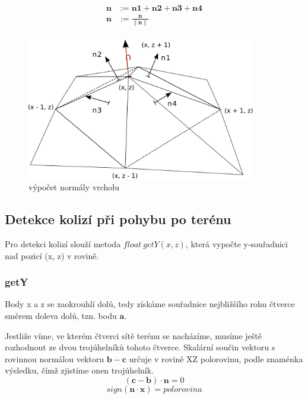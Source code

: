 \documentclass[11pt]{article}
\begin{document}
\begin{align*}
\mathbf n &:= \mathbf {n1} + \mathbf {n2} + \mathbf {n3} + \mathbf {n4} \\
\mathbf n &:= \frac{\mathbf n}{\|\mathbf n\|} \\
\end{align*}

\begin{figure}[ht!]
\centering
	\includegraphics[width=10cm]{normals_persp.pdf}
	\caption{výpočet normály vrcholu}
\end{figure}

\subsection{Detekce kolizí při pohybu po terénu}
Pro detekci kolizí slouží metoda $float~getY(x, z)$, která vypočte y-souřadnici
nad pozicí (x, z) v rovině.

\subsubsection{getY}
Body x a z se zaokrouhlí dolů, tedy získáme souřadnice nejbližšího rohu čtverce
směrem doleva dolů, tzn. bodu $\mathbf a$.

Jestliže víme, ve kterém čtverci sítě terénu se nacházíme, musíme ještě
rozhodnout ze dvou trojúhelníků tohoto čtverce. Skalární součin vektoru s
rovinnou normálou vektoru $\mathbf b - \mathbf c$ určuje v rovině XZ
polorovinu, podle znaménka výsledku, čímž zjistíme onen trojúhelník.  
$$
(\mathbf
c - \mathbf b) \cdot \mathbf n = 0
$$
$$
sign(\mathbf n \cdot \mathbf x) = polorovina
$$
\end{document}

